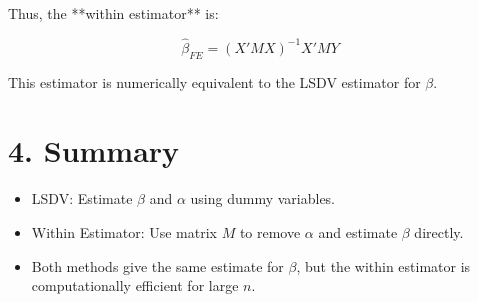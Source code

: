 \documentclass[12pt, oneside]{article}
\begin{document}
Thus, the **within estimator** is:

\[
\hat{\beta}_{FE} = (X'MX)^{-1}X'MY
\]

This estimator is numerically equivalent to the LSDV estimator for \( \beta \).

\section*{4. Summary}

\begin{itemize}
  \item LSDV: Estimate \( \beta \) and \( \alpha \) using dummy variables.
  \item Within Estimator: Use matrix \( M \) to remove \( \alpha \) and estimate \( \beta \) directly.
  \item Both methods give the same estimate for \( \beta \), but the within estimator is computationally efficient for large \( n \).
\end{itemize}
\end{document}
